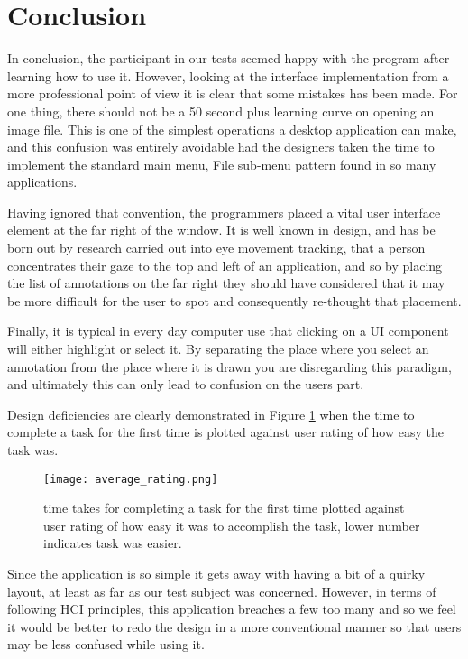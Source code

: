 \section{Conclusion}

In conclusion, the participant in our tests seemed happy with the program after learning how to use it.  However, looking at the interface implementation from a more professional point of view it is clear that some mistakes has been made.  For one thing, there should not be a 50 second plus learning curve on opening an image file.  This is one of the simplest operations a desktop application can make, and this confusion was entirely avoidable had the designers taken the time to implement the standard main menu, File sub-menu pattern found in so many applications.

Having ignored that convention, the programmers placed a vital user interface element at the far right of the window. It is well known in design, and has be born out by research carried out into eye movement tracking, that a person concentrates their gaze to the top and left of an application, and so by placing the list of annotations on the far right they should have considered that it may be more difficult for the user to spot and consequently re-thought that placement.  

Finally, it is typical in every day computer use that clicking on a UI component will either highlight or select it.  By separating the place where you select an annotation from the place where it is drawn you are disregarding this paradigm, and ultimately this can only lead to confusion on the users part.

Design deficiencies are clearly demonstrated in Figure \ref{fig:ave_rate} when the time to complete a task for the first time is plotted against user rating of how easy the task was.

\begin{figure}[t]
\centering
\texttt{[image: average\_rating.png]}
\caption{time takes for completing a task for the first time plotted against user rating of how easy it was to accomplish the task, lower number indicates task was easier. }
\label{fig:ave_rate}
\end{figure}

Since the application is so simple it gets away with having a bit of a quirky layout, at least as far as our test subject was concerned.  However, in terms of following HCI principles, this application breaches a few too many and so we feel it would be better to redo the design in a more conventional manner so that users may be less confused while using it.  